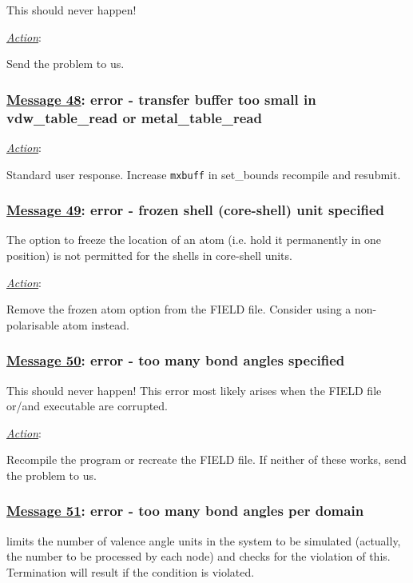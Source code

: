 This should never happen!

\noindent \underline{\em Action}:

Send the problem to us.

\subsubsection*{\underline{Message 48}: error - transfer buffer too small in vdw\_table\_read or metal\_table\_read}

\noindent \underline{\em Action}:

Standard user response.  Increase {\tt mxbuff} in {\sc
set\_bounds} recompile and resubmit.

\subsubsection*{\underline{Message 49}: error - frozen shell (core-shell) unit specified}

The \D option to freeze the location of an atom (i.e. hold it
permanently in one position) is not permitted for the shells in
core-shell units.

\noindent \underline{\em Action}:

Remove the frozen atom option from the FIELD file. Consider using
a non-polarisable atom instead.


\subsubsection*{\underline{Message 50}: error - too many bond angles specified}

This should never happen!  This error most likely arises when the
FIELD file or/and \D executable are corrupted.

\noindent \underline{\em Action}:

Recompile the program or recreate the FIELD file.  If neither of
these works, send the problem to us.

\subsubsection*{\underline{Message 51}: error - too many bond angles per domain}

\D limits the number of valence angle units
in the system to be simulated (actually, the number to be processed
by each node) and checks for the violation of this.  Termination will
result if the condition is violated.

